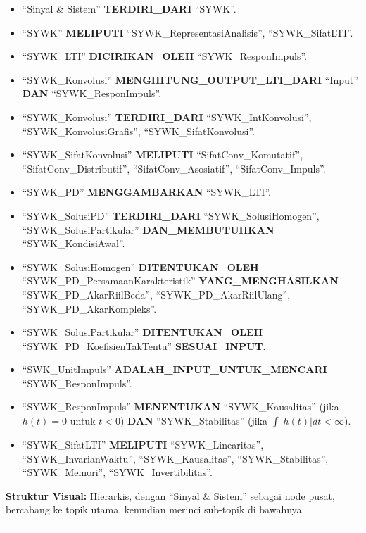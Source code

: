 \documentclass[
  letterpaper,
  DIV=11,
  numbers=noendperiod]{scrreprt}
\providecommand{\tightlist}{%
  \setlength{\itemsep}{0pt}\setlength{\parskip}{0pt}}
\begin{document}
\begin{itemize}
\tightlist
\item
  ``Sinyal \& Sistem'' \textbf{TERDIRI\_DARI} ``SYWK''.
\item
  ``SYWK'' \textbf{MELIPUTI} ``SYWK\_RepresentasiAnalisis'',
  ``SYWK\_SifatLTI''.
\item
  ``SYWK\_LTI'' \textbf{DICIRIKAN\_OLEH} ``SYWK\_ResponImpuls''.
\item
  ``SYWK\_Konvolusi'' \textbf{MENGHITUNG\_OUTPUT\_LTI\_DARI} ``Input''
  \textbf{DAN} ``SYWK\_ResponImpuls''.
\item
  ``SYWK\_Konvolusi'' \textbf{TERDIRI\_DARI} ``SYWK\_IntKonvolusi'',
  ``SYWK\_KonvolusiGrafis'', ``SYWK\_SifatKonvolusi''.
\item
  ``SYWK\_SifatKonvolusi'' \textbf{MELIPUTI} ``SifatConv\_Komutatif'',
  ``SifatConv\_Distributif'', ``SifatConv\_Asosiatif'',
  ``SifatConv\_Impuls''.
\item
  ``SYWK\_PD'' \textbf{MENGGAMBARKAN} ``SYWK\_LTI''.
\item
  ``SYWK\_SolusiPD'' \textbf{TERDIRI\_DARI} ``SYWK\_SolusiHomogen'',
  ``SYWK\_SolusiPartikular'' \textbf{DAN\_MEMBUTUHKAN}
  ``SYWK\_KondisiAwal''.
\item
  ``SYWK\_SolusiHomogen'' \textbf{DITENTUKAN\_OLEH}
  ``SYWK\_PD\_PersamaanKarakteristik'' \textbf{YANG\_MENGHASILKAN}
  ``SYWK\_PD\_AkarRiilBeda'', ``SYWK\_PD\_AkarRiilUlang'',
  ``SYWK\_PD\_AkarKompleks''.
\item
  ``SYWK\_SolusiPartikular'' \textbf{DITENTUKAN\_OLEH}
  ``SYWK\_PD\_KoefisienTakTentu'' \textbf{SESUAI\_INPUT}.
\item
  ``SWK\_UnitImpuls'' \textbf{ADALAH\_INPUT\_UNTUK\_MENCARI}
  ``SYWK\_ResponImpuls''.
\item
  ``SYWK\_ResponImpuls'' \textbf{MENENTUKAN} ``SYWK\_Kausalitas'' (jika
  \(h(t)=0\) untuk \(t<0\)) \textbf{DAN} ``SYWK\_Stabilitas'' (jika
  \(\int |h(t)|dt < \infty\)).
\item
  ``SYWK\_SifatLTI'' \textbf{MELIPUTI} ``SYWK\_Linearitas'',
  ``SYWK\_InvarianWaktu'', ``SYWK\_Kausalitas'', ``SYWK\_Stabilitas'',
  ``SYWK\_Memori'', ``SYWK\_Invertibilitas''.
\end{itemize}

\textbf{Struktur Visual:} Hierarkis, dengan ``Sinyal \& Sistem'' sebagai
node pusat, bercabang ke topik utama, kemudian merinci sub-topik di
bawahnya.

\begin{center}\rule{0.5\linewidth}{0.5pt}\end{center}
\end{document}
